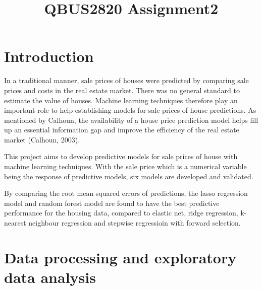 \documentclass[letterpaper,12pt,twoside,]{pinp}
\title{QBUS2820 Assignment2}
\author[]{}
\begin{document}
\verticaladjustment{-2pt}

\maketitle
\thispagestyle{firststyle}



\hypertarget{introduction}{%
\section{Introduction}\label{introduction}}

In a traditional manner, sale prices of houses were predicted by
comparing sale prices and costs in the real estate market. There was no
general standard to estimate the value of houses. Machine learning
techniques therefore play an important role to help establishing models
for sale prices of house predictions. As mentioned by Calhoun, the
availability of a house price prediction model helps fill up an
essential information gap and improve the efficiency of the real estate
market (Calhoun, 2003).

This project aims to develop predictive models for sale prices of house
with machine learning techniques. With the sale price which is a
numerical variable being the response of predictive models, six models
are developed and validated.

By comparing the root mean squared errors of predictions, the lasso
regression model and random forest model are found to have the best
predictive performance for the housing data, compared to elastic net,
ridge regression, k-nearest neighbour regression and stepwise
regressioin with forward selection.

\hypertarget{data-processing-and-exploratory-data-analysis}{%
\section{Data processing and exploratory data
analysis}\label{data-processing-and-exploratory-data-analysis}}
\end{document}

